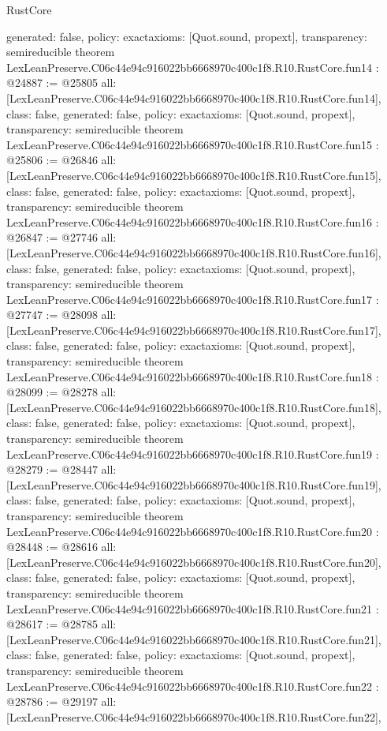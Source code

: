 \begin{lexlean}{RustCore}
\begin{coremodule}
{  generated: false,
  policy: exact{axioms: [Quot.sound, propext]},
  transparency: semireducible
}
theorem LexLeanPreserve.C06c44e94c916022bb6668970c400c1f8.R10.RustCore.fun14 : @24887 := @25805 {
  all: [LexLeanPreserve.C06c44e94c916022bb6668970c400c1f8.R10.RustCore.fun14],
  class: false,
  generated: false,
  policy: exact{axioms: [Quot.sound, propext]},
  transparency: semireducible
}
theorem LexLeanPreserve.C06c44e94c916022bb6668970c400c1f8.R10.RustCore.fun15 : @25806 := @26846 {
  all: [LexLeanPreserve.C06c44e94c916022bb6668970c400c1f8.R10.RustCore.fun15],
  class: false,
  generated: false,
  policy: exact{axioms: [Quot.sound, propext]},
  transparency: semireducible
}
theorem LexLeanPreserve.C06c44e94c916022bb6668970c400c1f8.R10.RustCore.fun16 : @26847 := @27746 {
  all: [LexLeanPreserve.C06c44e94c916022bb6668970c400c1f8.R10.RustCore.fun16],
  class: false,
  generated: false,
  policy: exact{axioms: [Quot.sound, propext]},
  transparency: semireducible
}
theorem LexLeanPreserve.C06c44e94c916022bb6668970c400c1f8.R10.RustCore.fun17 : @27747 := @28098 {
  all: [LexLeanPreserve.C06c44e94c916022bb6668970c400c1f8.R10.RustCore.fun17],
  class: false,
  generated: false,
  policy: exact{axioms: [Quot.sound, propext]},
  transparency: semireducible
}
theorem LexLeanPreserve.C06c44e94c916022bb6668970c400c1f8.R10.RustCore.fun18 : @28099 := @28278 {
  all: [LexLeanPreserve.C06c44e94c916022bb6668970c400c1f8.R10.RustCore.fun18],
  class: false,
  generated: false,
  policy: exact{axioms: [Quot.sound, propext]},
  transparency: semireducible
}
theorem LexLeanPreserve.C06c44e94c916022bb6668970c400c1f8.R10.RustCore.fun19 : @28279 := @28447 {
  all: [LexLeanPreserve.C06c44e94c916022bb6668970c400c1f8.R10.RustCore.fun19],
  class: false,
  generated: false,
  policy: exact{axioms: [Quot.sound, propext]},
  transparency: semireducible
}
theorem LexLeanPreserve.C06c44e94c916022bb6668970c400c1f8.R10.RustCore.fun20 : @28448 := @28616 {
  all: [LexLeanPreserve.C06c44e94c916022bb6668970c400c1f8.R10.RustCore.fun20],
  class: false,
  generated: false,
  policy: exact{axioms: [Quot.sound, propext]},
  transparency: semireducible
}
theorem LexLeanPreserve.C06c44e94c916022bb6668970c400c1f8.R10.RustCore.fun21 : @28617 := @28785 {
  all: [LexLeanPreserve.C06c44e94c916022bb6668970c400c1f8.R10.RustCore.fun21],
  class: false,
  generated: false,
  policy: exact{axioms: [Quot.sound, propext]},
  transparency: semireducible
}
theorem LexLeanPreserve.C06c44e94c916022bb6668970c400c1f8.R10.RustCore.fun22 : @28786 := @29197 {
  all: [LexLeanPreserve.C06c44e94c916022bb6668970c400c1f8.R10.RustCore.fun22],
}
\end{coremodule}
\end{lexlean}
